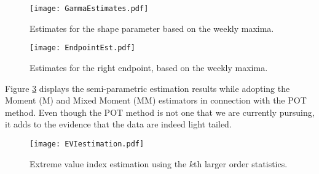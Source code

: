 \documentclass[a4paper]{article}
\begin{document}
\begin{figure}
\begin{center}
\texttt{[image: GammaEstimates.pdf]}
\caption{Estimates for the shape parameter based on the weekly maxima.} \label{fig:gammaEst}
\end{center}
\end{figure}

\begin{figure}
\begin{center}
\texttt{[image: EndpointEst.pdf]}
\caption{Estimates for the right endpoint, based on the weekly maxima.} \label{fig:EndPointEst}
\end{center}
\end{figure}

Figure \ref{fig:POTEst} displays the semi-parametric estimation results while adopting the Moment (M) and Mixed Moment (MM) estimators in connection with the POT method. Even though the POT method is not one that we are currently pursuing, it adds to the evidence that the data are indeed light tailed.

\begin{figure}
\begin{center}
\texttt{[image: EVIestimation.pdf]}
\caption{Extreme value index estimation using the $k$th larger order statistics.} \label{fig:POTEst}
\end{center}
\end{figure}



\end{document}
